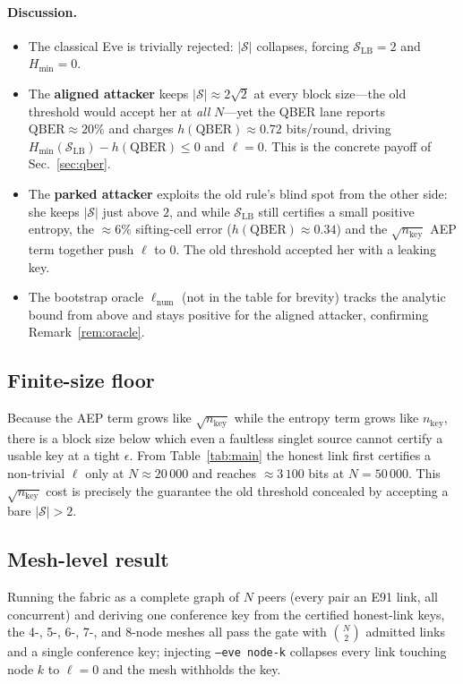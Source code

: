 \documentclass[11pt,a4paper]{article}
\newcommand{\CHSH}{\mathcal{S}}
\newcommand{\eps}{\epsilon}
\newcommand{\keylen}{n_{\mathrm{key}}}
\newcommand{\QBER}{\mathrm{QBER}}
\newcommand{\Hmin}{H_{\min}}
\newcommand{\SLB}{\mathcal{S}_{\mathrm{LB}}}
\newcommand{\bits}{\ell}
\newcommand{\bell}{2\sqrt{2}}
\newcommand{\code}[1]{\texttt{#1}}
\theoremstyle{plain}
\theoremstyle{definition}
\begin{document}
\paragraph{Discussion.}
\begin{itemize}
  \item The classical Eve is trivially rejected: $|\CHSH|$ collapses, forcing
    $\SLB = 2$ and $\Hmin = 0$.
  \item The \textbf{aligned attacker} keeps $|\CHSH|\approx\bell$ at every block
    size---the old threshold would accept her at \emph{all} $N$---yet the QBER
    lane reports $\QBER\approx 20\%$ and charges $h(\QBER)\approx 0.72$ bits/round,
    driving $\Hmin(\SLB)-h(\QBER)\le 0$ and $\bits = 0$. This is the concrete
    payoff of Sec.~\ref{sec:qber}.
  \item The \textbf{parked attacker} exploits the old rule's blind spot from the
    other side: she keeps $|\CHSH|$ just above $2$, and while $\SLB$ still
    certifies a small positive entropy, the $\approx 6\%$ sifting-cell error
    ($h(\QBER)\approx 0.34$) and the $\sqrt{\keylen}$ AEP term together push
    $\bits$ to $0$. The old threshold accepted her with a leaking key.
  \item The bootstrap oracle $\bits_{\mathrm{num}}$ (not in the table for
    brevity) tracks the analytic bound from above and stays positive for the
    aligned attacker, confirming Remark~\ref{rem:oracle}.
\end{itemize}

\subsection{Finite-size floor}\label{sec:finitesize}
Because the AEP term grows like $\sqrt{\keylen}$ while the entropy term grows
like $\keylen$, there is a block size below which even a faultless singlet
source cannot certify a usable key at a tight $\eps$. From Table~\ref{tab:main}
the honest link first certifies a non-trivial $\bits$ only at
$N \approx 20\,000$ and reaches $\approx 3\,100$ bits at $N = 50\,000$. This
$\sqrt{\keylen}$ cost is precisely the guarantee the old threshold concealed by
accepting a bare $|\CHSH| > 2$.

\subsection{Mesh-level result}
Running the fabric as a complete graph of $N$ peers (every pair an E91 link,
all concurrent) and deriving one conference key from the certified honest-link
keys, the 4-, 5-, 6-, 7-, and 8-node meshes all pass the gate with
$\binom{N}{2}$ admitted links and a single conference key; injecting
\code{--eve node-k} collapses every link touching node $k$ to $\bits = 0$ and
the mesh withholds the key.
\end{document}
